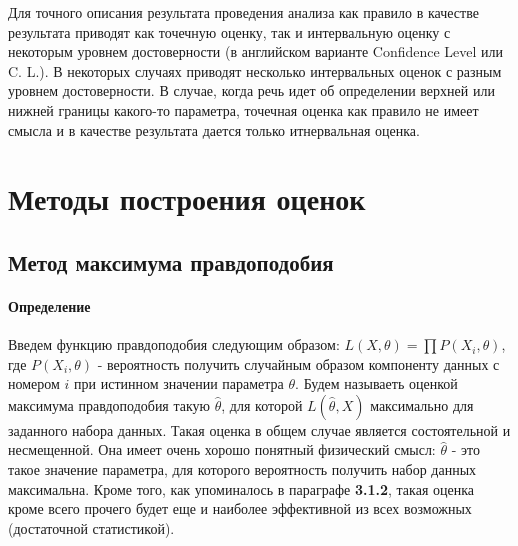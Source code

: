Для точного описания результата проведения анализа как правило в
качестве результата приводят как точечную оценку, так и интервальную
оценку с некоторым уровнем достоверности (в английском варианте
Confidence Level или C. L.). В некоторых случаях приводят несколько
интервальных оценок с разным уровнем достоверности. В случае, когда речь
идет об определении верхней или нижней границы какого-то параметра,
точечная оценка как правило не имеет смысла и в качестве результата
дается только итнервальная оценка.



\section{Методы построения оценок}

\subsection{Метод максимума правдоподобия}


\paragraph{Определение}

Введем функцию правдоподобия следующим образом:
$L(X,\theta) = \prod{P(X_i,\theta)}$, где $P(X_i, \theta)$ -
вероятность получить случайным образом компоненту данных с номером $i$
при истинном значении параметра $\theta$. Будем называеть оценкой
максимума правдоподобия такую $\hat\theta$, для которой
$L(\hat\theta, X)$ максимально для заданного набора данных. Такая
оценка в общем случае является состоятельной и несмещенной. Она имеет
очень хорошо понятный физический смысл: $\hat\theta$ - это такое
значение параметра, для которого вероятность получить набор данных
максимальна. Кроме того, как упоминалось в параграфе \textbf{3.1.2},
такая оценка кроме всего прочего будет еще и наиболее эффективной из
всех возможных (достаточной статистикой).

